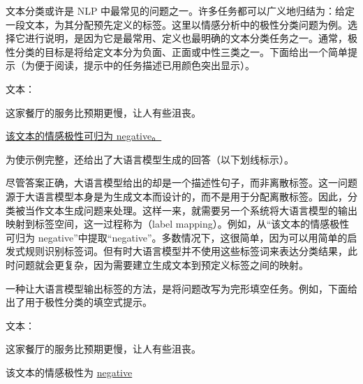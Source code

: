 \noindent 文本分类或许是 NLP 中最常见的问题之一。许多任务都可以广义地归结为：给定一段文本，为其分配预先定义的标签。这里以情感分析中的极性分类问题为例。选择它进行说明，是因为它是最常用、定义也最明确的文本分类任务之一。通常，极性分类的目标是将给定文本分为负面、正面或中性三类之一。下面给出一个简单提示（为便于阅读，提示中的任务描述已用颜色突出显示）。

\vspace{0.5em}
\begin{tcolorbox}

\begingroup
\setlength{\leftskip}{2em}
\setlength{\rightskip}{2em}


\vspace{0.7em}

文本：

这家餐厅的服务比预期更慢，让人有些沮丧。

\vspace{0.7em}

\underline{该文本的情感极性可归为 negative。}

\endgroup

\end{tcolorbox}
\vspace{0.5em}

\noindent 为使示例完整，还给出了大语言模型生成的回答（以下划线标示）。

尽管答案正确，大语言模型给出的却是一个描述性句子，而非离散标签。这一问题源于大语言模型本身是为生成文本而设计的，而不是用于分配离散标签。因此，分类被当作文本生成问题来处理。这样一来，就需要另一个系统将大语言模型的输出映射到标签空间，这一过程称为（label mapping）。例如，从“该文本的情感极性可归为 negative”中提取“negative”。多数情况下，这很简单，因为可以用简单的启发式规则识别标签词。但有时大语言模型并不使用这些标签词来表达分类结果，此时问题就会更复杂，因为需要建立生成文本到预定义标签之间的映射。

一种让大语言模型输出标签的方法，是将问题改写为完形填空任务。例如，下面给出了用于极性分类的填空式提示。

\vspace{0.5em}
\begin{tcolorbox}

\begingroup
\setlength{\leftskip}{2em}
\setlength{\rightskip}{2em}


\vspace{0.7em}

文本：

这家餐厅的服务比预期更慢，让人有些沮丧。

\vspace{0.7em}

该文本的情感极性为 \underline{negative}

\endgroup

\end{tcolorbox}
\vspace{0.5em}

